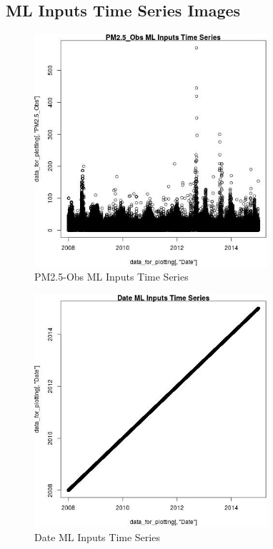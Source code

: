 
\subsection{ML Inputs Time Series Images} 
 

\begin{figure} 
\centering  
\includegraphics[width=0.77\textwidth]{Code_Outputs/ML_input_report_ML_input_PM25_Step5_part_d_de_duplicated_aves_ML_input_PM25_ObsvDate.jpg} 
\caption{\label{fig:ML_input_report_ML_input_PM25_Step5_part_d_de_duplicated_aves_ML_inputPM25_ObsvDate}PM2.5-Obs ML Inputs Time Series} 
\end{figure} 
 

\begin{figure} 
\centering  
\includegraphics[width=0.77\textwidth]{Code_Outputs/ML_input_report_ML_input_PM25_Step5_part_d_de_duplicated_aves_ML_input_DatevDate.jpg} 
\caption{\label{fig:ML_input_report_ML_input_PM25_Step5_part_d_de_duplicated_aves_ML_inputDatevDate}Date ML Inputs Time Series} 
\end{figure} 
 

